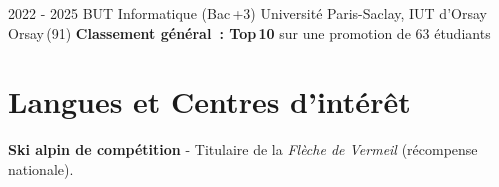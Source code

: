 \documentclass[11pt, a4paper]{moderncv}
\begin{document}
\cventry%
  {2022 - 2025}%
  {BUT Informatique (Bac\,+3)}%
  {Université Paris-Saclay, IUT d'Orsay}%
  {Orsay\,(91)}%
  {\textbf{Classement général~: Top\,10} sur une promotion de 63 étudiants}%
  {}

\section{Langues et Centres d'intérêt}

  \textbf{Ski alpin de compétition} -
  Titulaire de la \textit{Flèche de Vermeil} (récompense nationale).


\end{document}
